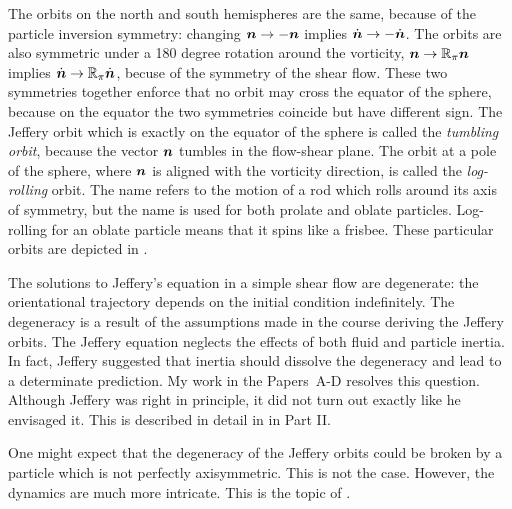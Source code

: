 \documentclass[thesis.tex]{subfiles}
\begin{document}
The orbits on the north and south hemispheres are the same, because of the particle inversion symmetry: changing $\mbox{\boldmath$n$} \to -\mbox{\boldmath$n$}$ implies $\dot{\mbox{\boldmath$n$}} \to - \dot{\mbox{\boldmath$n$}}$. The orbits are also symmetric under a 180 degree rotation around the vorticity, $\mbox{\boldmath$n$} \to \mathbb{R}_\pi \mbox{\boldmath$n$}$ implies $\dot{\mbox{\boldmath$n$}} \to \mathbb{R}_\pi \dot{\mbox{\boldmath$n$}}$, becuse of the symmetry of the shear flow. These two symmetries together enforce that no orbit may cross the equator of the sphere, because on the equator the two symmetries coincide but have different sign. The Jeffery orbit which is exactly on the equator of the sphere is called the \emph{tumbling orbit}, because the vector $\mbox{\boldmath$n$}$ tumbles in the flow-shear plane. The orbit at a pole of the sphere, where $\mbox{\boldmath$n$}$ is aligned with the vorticity direction, is called the \emph{log-rolling} orbit. The name refers to the motion of a rod which rolls around its axis of symmetry, but the name is used for both prolate and oblate particles. Log-rolling for an oblate particle means that it spins like a frisbee. These particular orbits are depicted in .

The solutions to Jeffery's equation in a simple shear flow are degenerate: the orientational trajectory depends on the initial condition indefinitely. The degeneracy is a result of the assumptions made in the course deriving the Jeffery orbits. The Jeffery equation neglects the effects of both fluid and particle inertia. In fact, Jeffery suggested that inertia should dissolve the degeneracy and lead to a determinate prediction. My work in the Papers~A-D resolves this question. Although Jeffery was right in principle, it did not turn out exactly like he envisaged it. This is described in detail in  in Part II.

One might expect that the degeneracy of the Jeffery orbits could be broken by a particle which is not perfectly axisymmetric. This is not the case. However, the dynamics are much more intricate. This is the topic of .
\end{document}
